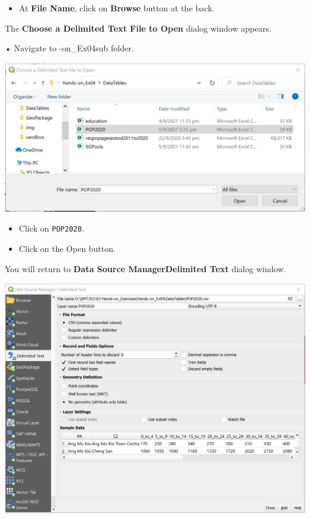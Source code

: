 \documentclass[
  letterpaper,
  DIV=11,
  numbers=noendperiod]{scrreprt}
\providecommand{\tightlist}{%
  \setlength{\itemsep}{0pt}\setlength{\parskip}{0pt}}\usepackage{longtable,booktabs,array}
\begin{document}
\begin{itemize}
\tightlist
\item
  At \textbf{File Name}, click on \textbf{Browse} button at the back.
\end{itemize}

The \textbf{Choose a Delimited Text File to Open} dialog window appears.

• Navigate to \Hands-on\_Ex04\DataTables sub folder.

\includegraphics{./img03/image19.jpg}

\begin{itemize}
\tightlist
\item
  Click on \texttt{POP2020}.\\
\item
  Click on the Open button.
\end{itemize}

You will return to \textbf{Data Source Manager\textbar Delimited Text}
dialog window.

\includegraphics{./img03/image20.jpg}
\end{document}

